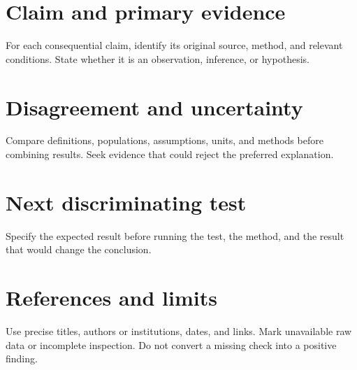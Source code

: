 \documentclass[11pt]{article}
\begin{document}
\section*{Claim and primary evidence}
For each consequential claim, identify its original source, method, and relevant conditions. State whether it is an observation, inference, or hypothesis.
\section*{Disagreement and uncertainty}
Compare definitions, populations, assumptions, units, and methods before combining results. Seek evidence that could reject the preferred explanation.
\section*{Next discriminating test}
Specify the expected result before running the test, the method, and the result that would change the conclusion.
\section*{References and limits}
Use precise titles, authors or institutions, dates, and links. Mark unavailable raw data or incomplete inspection. Do not convert a missing check into a positive finding.
\end{document}
